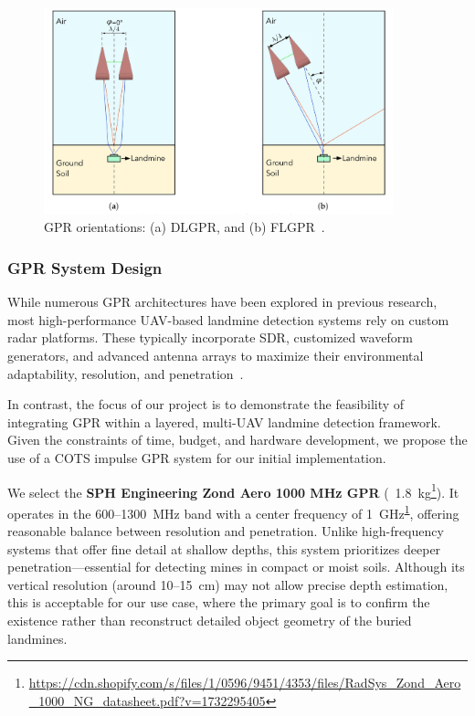 \begin{figure}[H]
    \centering
    \includegraphics[height=6cm]{figs/Huirui/gpr_ori_modes.png}
    \caption{\gls{GPR} orientations: (a) \gls{DLGPR}, and (b) \gls{FLGPR}~\cite{vsipovs2020lightweight}.}
    \label{fig:GPR_Ori_modes}
\end{figure}



\subsubsection{\gls{GPR} System Design}\label{GPR_design}

While numerous \gls{GPR} architectures have been explored in previous research, most high-performance \gls{UAV}-based landmine detection systems rely on custom radar platforms. These typically incorporate \gls{SDR}, customized waveform generators, and advanced antenna arrays to maximize their environmental adaptability, resolution, and penetration~\cite{cerquera2017uav}.

In contrast, the focus of our project is to demonstrate the feasibility of integrating \gls{GPR} within a layered, multi-\gls{UAV} landmine detection framework. Given the constraints of time, budget, and hardware development, we propose the use of a \gls{COTS} impulse \gls{GPR} system for our initial implementation.

We select the \textbf{SPH Engineering Zond Aero 1000 MHz \gls{GPR}} (~1.8~kg\footnote{\label{Zond}\url{https://cdn.shopify.com/s/files/1/0596/9451/4353/files/RadSys_Zond_Aero_1000_NG_datasheet.pdf?v=1732295405}}). It operates in the 600–1300~MHz band with a center frequency of 1~GHz\textsuperscript{\ref{Zond}}, offering reasonable balance between resolution and penetration. Unlike high-frequency systems that offer fine detail at shallow depths, this system prioritizes deeper penetration—essential for detecting mines in compact or moist soils. Although its vertical resolution (around 10--15~cm) may not allow precise depth estimation, this is acceptable for our use case, where the primary goal is to confirm the existence rather than reconstruct detailed object geometry of the buried landmines.

